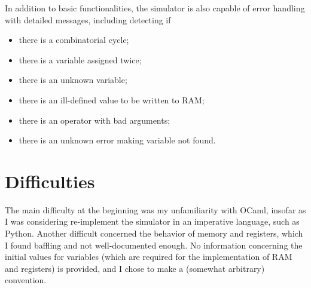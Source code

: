 \documentclass{amsart}
\begin{document}
	In addition to basic functionalities, the simulator is also capable of error handling with detailed messages, including detecting if  
	\begin{itemize}
		\item there is a combinatorial cycle;
		\item there is a variable assigned twice;
		\item there is an unknown variable;
		\item there is an ill-defined value to be written to RAM;
		\item there is an operator with bad arguments;
		\item there is an unknown error making variable not found.
	\end{itemize}
	
	\section{Difficulties}
	
	The main difficulty at the beginning was my unfamiliarity with OCaml, insofar as I was considering re-implement the simulator in an imperative language, such as Python. Another difficult concerned the behavior of memory and registers, which I found baffling and not well-documented enough. No information concerning the initial values for variables (which are required for the implementation of RAM and registers) is provided, and I chose to make a (somewhat arbitrary) convention.
	
\end{document}
